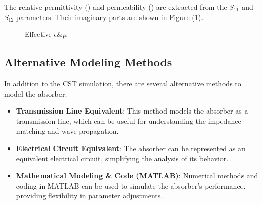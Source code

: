         The relative permittivity (\epsilon) and permeability (\mu) are extracted 
        from the $S_{11}$ and $S_{12}$ parameters. Their imaginary parts are shown 
        in Figure (\ref{plt:EpsilonMu}).
        \begin{figure}[h]
            \centering
            \caption{\textsf{Effective $\epsilon \& \mu$}}
            \label{plt:EpsilonMu}
        \end{figure}
        

    \subsection{\textsf{Alternative Modeling Methods}}

        In addition to the CST simulation, there are several alternative methods
        to model the absorber:
        \begin{itemize}
            \item \textbf{Transmission Line Equivalent}: This method models the 
                absorber as a transmission line, which can be useful for 
                understanding the impedance matching and wave propagation.
            \item \textbf{Electrical Circuit Equivalent}: The absorber can be 
                represented as an equivalent electrical circuit, simplifying the
                analysis of its behavior.
            \item \textbf{Mathematical Modeling \& Code (MATLAB)}: Numerical methods
                and coding in MATLAB can be used to simulate the absorber's 
                performance, providing flexibility in parameter adjustments.
        \end{itemize}
    
